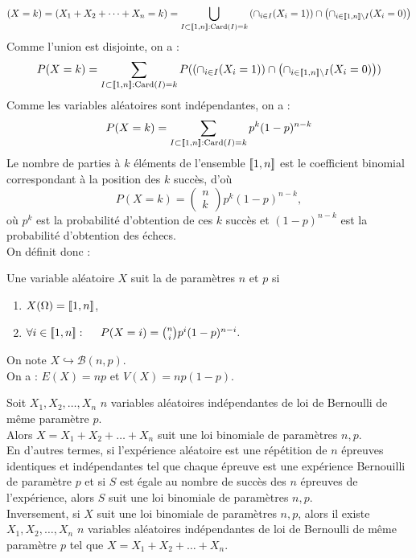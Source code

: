 \documentclass{book}
\begin{document}
$$(X = k) = (X_1+ X_2+\dots+ X_n=k)=\bigcup_{I\subset\mathopen\lbrack\!\lbrack1,n \mathclose\rbrack\!\rbrack:\operatorname{Card} (I)=k} \left(\cap_{i\in I} (X_i=1)\right)\cap \left(\cap_{i\in \mathopen\lbrack\!\lbrack1,n \mathclose\rbrack\!\rbrack\setminus I} (X_i=0)\right)$$
Comme l'union est disjointe, on a :
$$P(X = k) =\sum_{I\subset\mathopen\lbrack\!\lbrack1,n \mathclose\rbrack\!\rbrack:\operatorname{Card} (I)=k } P(\left(\cap_{i\in I} (X_i=1)\right)\cap \left(\cap_{i\in \mathopen\lbrack\!\lbrack1,n \mathclose\rbrack\!\rbrack\setminus I} (X_i=0)\right))$$
Comme les variables aléatoires sont indépendantes, on a :
$$P(X = k) =\sum_{I\subset\mathopen\lbrack\!\lbrack1,n \mathclose\rbrack\!\rbrack:\operatorname{Card} (I)=k} p^k(1-p)^{n-k}$$
Le nombre de parties à $k$ éléments de l'ensemble $\mathopen\lbrack\!\lbrack1,n \mathclose\rbrack\!\rbrack$ est le coefficient binomial correspondant à la position des $k$ succès, d'où
$$P(X = k) =\begin{pmatrix}n\\k\end{pmatrix} p^k(1-p)^{n-k},$$
où $p^k$ est la probabilité d'obtention de ces $k$
succès et $(1 - p)^{n-k}$ est la probabilité d'obtention des échecs.\\
On définit donc :
\begin{Definition}
Une variable aléatoire $X$ suit la  de paramètres $n$ et $p$
si
\begin{enumerate}
\item $X(\Omega)= \mathopen\lbrack\!\lbrack1,n \mathclose\rbrack\!\rbrack$,
\item $\forall i\in\mathopen\lbrack\!\lbrack1,n \mathclose\rbrack\!\rbrack:\quad\ P(X=i) = \binom{n}{i} p^i (1-p)^{n-i}.$ 
\end{enumerate} 
On note $X \hookrightarrow  \mathcal{B}(n,p)$.\\
On a : $E(X)=np$ et $V(X)=np(1-p)$.
\end{Definition}
\begin{Proposition}
Soit $X_1, X_2,\dots, X_n$ $n$ variables aléatoires indépendantes de loi de Bernoulli de même paramètre $p$.\\
Alors $X=X_1+ X_2+\dots+ X_n$ suit une loi binomiale de paramètres $n, p$.\\
En d'autres termes, si l'expérience aléatoire est  une répétition de $n$ épreuves identiques et indépendantes tel que chaque épreuve est une expérience Bernouilli de paramètre  $p$ et si $S$ est égale au nombre de succès des $n$ épreuves de l'expérience, alors $S$  suit une loi binomiale de paramètres $n, p$.\\
Inversement, si $X$ suit une loi binomiale de paramètres $n, p$, alors il existe $X_1, X_2,\dots, X_n$ $n$ variables aléatoires indépendantes de loi de Bernoulli de même paramètre $p$ tel que $X=X_1+ X_2+\dots+ X_n$.    
\end{Proposition}
\end{document}

